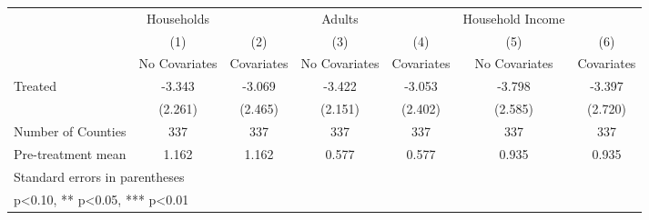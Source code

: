 {
\def\sym#1{\ifmmode^{#1}\else\(^{#1}\)\fi}
\begin{tabular}{l*{6}{c}}
\hline\hline
            &  Households   &               &      Adults   &               &Household Income   &               \\
            &\multicolumn{1}{c}{(1)}&\multicolumn{1}{c}{(2)}&\multicolumn{1}{c}{(3)}&\multicolumn{1}{c}{(4)}&\multicolumn{1}{c}{(5)}&\multicolumn{1}{c}{(6)}\\
            &\multicolumn{1}{c}{No Covariates}&\multicolumn{1}{c}{Covariates}&\multicolumn{1}{c}{No Covariates}&\multicolumn{1}{c}{Covariates}&\multicolumn{1}{c}{No Covariates}&\multicolumn{1}{c}{Covariates}\\
\hline
Treated     &      -3.343   &      -3.069   &      -3.422   &      -3.053   &      -3.798   &      -3.397   \\
            &     (2.261)   &     (2.465)   &     (2.151)   &     (2.402)   &     (2.585)   &     (2.720)   \\
\hline
Number of Counties&         337   &         337   &         337   &         337   &         337   &         337   \\
Pre-treatment mean&       1.162   &       1.162   &       0.577   &       0.577   &       0.935   &       0.935   \\
\hline\hline
\multicolumn{7}{l}{\footnotesize Standard errors in parentheses}\\
\multicolumn{7}{l}{\footnotesize * p<0.10, ** p<0.05, *** p<0.01}\\
\end{tabular}
}
